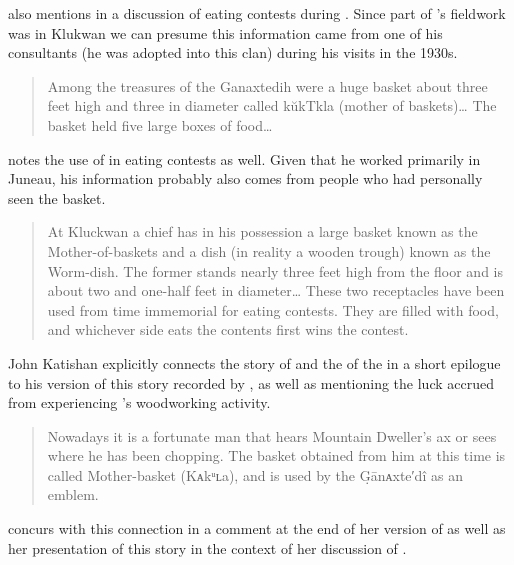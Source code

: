 \citeauthor{olson:1967} also mentions  in a discussion of eating contests during .
Since part of \citeauthor{olson:1967}’s fieldwork was in Klukwan we can presume this information came from one of his  consultants (he was adopted into this clan) during his visits in the 1930s.

\begin{quote}\small
Among the treasures of the Ganaxtedih were a huge basket about three feet high and three in diameter called kŭkTkla (mother of baskets)… The basket held five large boxes of food…
\end{quote}

\citeauthor{jones:1914} notes the use of  in eating contests as well.
Given that he worked primarily in Juneau, his information probably also comes from people who had personally seen the basket.

\begin{quote}\small
At Kluckwan a chief has in his possession a large basket known as the Mother-of-baskets and a dish (in reality a wooden trough) known as the Worm-dish.
The former stands nearly three feet high from the floor and is about two and one-half feet in diameter…
These two receptacles have been used from time immemorial for eating contests.
They are filled with food, and whichever side eats the contents first wins the contest.
\end{quote}

 John Katishan explicitly connects the story of  and the  of the  in a short epilogue to his version of this story recorded by \citeauthor{swanton:1909}, as well as mentioning the luck accrued from experiencing ’s woodworking activity.

\begin{quote}\small
Nowadays it is a fortunate man that hears Mountain Dweller’s ax or sees where he has been chopping. The basket obtained from him at this time is called Mother-basket (Kᴀkᵘʟa), and is used by the G̣ānᴀxte′dî as an emblem.
\end{quote}

\citeauthor{paul:1944} concurs with this connection in a comment at the end of her version of  as well as her presentation of this story in the context of her discussion of .


